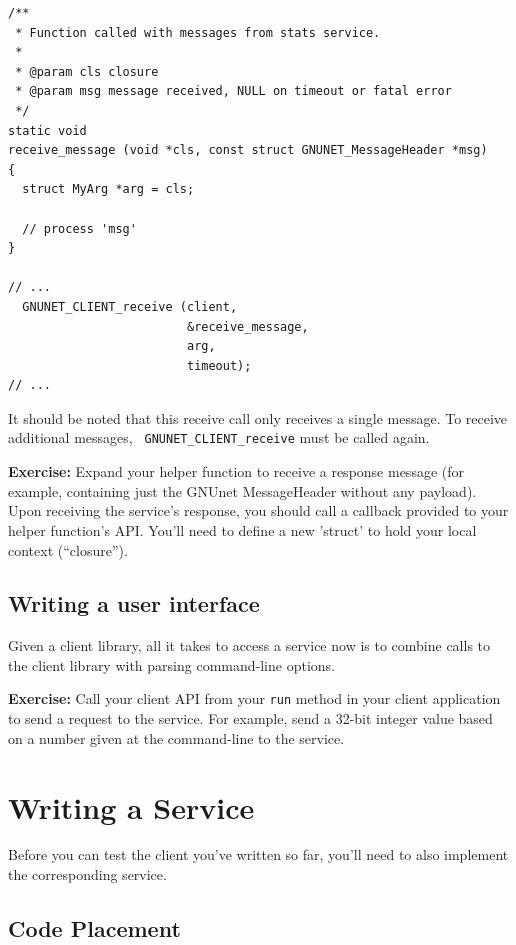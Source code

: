 \documentclass[10pt]{article}
\newcommand{\exercise}[1]{\noindent\begin{boxedminipage}{\textwidth}{\bf Exercise:} #1 \end{boxedminipage}}
\begin{document}
\lstset{language=c}
\begin{lstlisting}
/**
 * Function called with messages from stats service.
 *
 * @param cls closure
 * @param msg message received, NULL on timeout or fatal error
 */
static void
receive_message (void *cls, const struct GNUNET_MessageHeader *msg)
{
  struct MyArg *arg = cls;

  // process 'msg'
}

// ...
  GNUNET_CLIENT_receive (client,
                         &receive_message,
                         arg,
                         timeout);
// ...
\end{lstlisting}

It should be noted that this receive call only receives a single
message.  To receive additional messages, {\tt
  GNUNET\_CLIENT\_receive} must be called again.

\exercise{Expand your helper function to receive a
response message (for example, containing just the GNUnet MessageHeader
without any payload).  Upon receiving the service's response, you should
call a callback provided to your helper function's API.  You'll need to
define a new 'struct' to hold your local context (``closure'').}


\subsection{Writing a user interface}

Given a client library, all it takes to access a service now is to
combine calls to the client library with parsing command-line
options.

\exercise{Call your client API from your {\tt run} method
in your client application to send a request to the service.
For example, send a 32-bit integer value based on a number given
at the command-line to the service.}



\section{Writing a Service}

Before you can test the client you've written so far, you'll need to also
implement the corresponding service.


\subsection{Code Placement}
\end{document}
